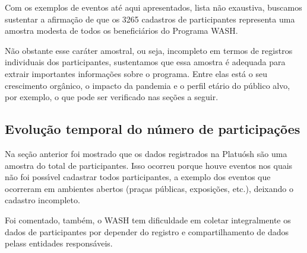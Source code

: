 \documentclass[
12pt,		%
openright,	%
twoside,  %
a4paper,			%
chapter=TITLE,		%
english,			%
french,				%
spanish,			%
brazil				%
]{USPSC-classe/USPSC}
\begin{document}
Com os exemplos de eventos at\'e aqui apresentados, lista n\~ao exaustiva, buscamos sustentar a afirma\c{c}\~ao de que os 3265 cadastros de participantes representa uma amostra modesta de todos os benefici\'arios do Programa WASH.

















N\~ao obstante esse car\'ater amostral, ou seja, incompleto em termos de registros individuais dos participantes, sustentamos que essa amostra \'e adequada para extrair importantes informa\c{c}\~oes sobre o programa. Entre elas est\'a o seu crescimento org\^anico, o impacto da pandemia e o perfil et\'ario do p\'ublico alvo, por exemplo, o que pode ser verificado nas se\c{c}\~oes a seguir.

















\subsection[Evolu\c{c}\~ao temporal do n\'umero de participa\c{c}\~oes]{Evolu\c{c}\~ao temporal do n\'umero de participa\c{c}\~oes}\label{Evolu\c{c}\~ao temporal do n\'umero de participa\c{c}\~oes}
Na se\c{c}\~ao anterior foi mostrado que os dados registrados na Platu\'osh s\~ao uma amostra do total de participantes. Isso ocorreu porque houve eventos nos quais n\~ao foi poss\'{\i}vel cadastrar todos participantes, a exemplo dos eventos que ocorreram em ambientes abertos (pra\c{c}as p\'ublicas, exposi\c{c}\~oes, etc.), deixando o cadastro incompleto.

















Foi comentado, tamb\'em, o WASH tem dificuldade em coletar integralmente os dados de participantes por depender do registro e compartilhamento de dados pelass entidades respons\'aveis.
\end{document}
